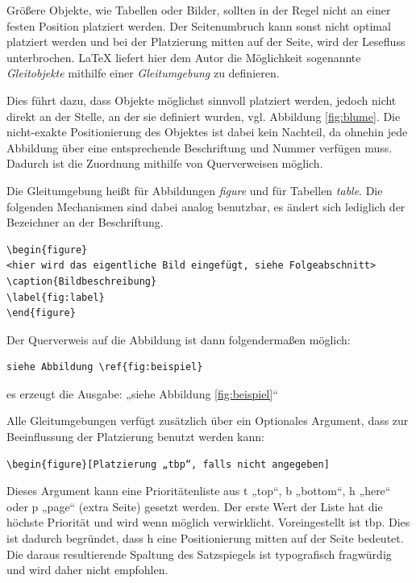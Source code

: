 Größere Objekte, wie Tabellen oder Bilder, sollten in der Regel nicht an einer festen Position platziert werden.
Der Seitenumbruch kann sonst nicht optimal platziert werden und bei der Platzierung mitten auf der Seite, wird der Lesefluss unterbrochen.
\LaTeX{} liefert hier dem Autor die Möglichkeit sogenannte \emph{Gleitobjekte} mithilfe einer \emph{Gleitumgebung} zu definieren.

Dies führt dazu, dass Objekte möglichst sinnvoll platziert werden, jedoch nicht direkt an der Stelle, an der sie definiert wurden, vgl. Abbildung \ref{fig:blume}.
Die nicht-exakte Positionierung des Objektes ist dabei kein Nachteil, da ohnehin jede Abbildung über eine entsprechende Beschriftung und Nummer verfügen muss.
Dadurch ist die Zuordnung mithilfe von Querverweisen möglich.

Die Gleitumgebung heißt für Abbildungen \emph{figure} und für Tabellen \emph{table}. Die folgenden Mechanismen sind dabei analog benutzbar, es ändert sich lediglich der Bezeichner an der Beschriftung.

\begin{verbatim}
\begin{figure}
<hier wird das eigentliche Bild eingefügt, siehe Folgeabschnitt>
\caption{Bildbeschreibung}
\label{fig:label}
\end{figure}
\end{verbatim}


Der Querverweis auf die Abbildung ist dann folgendermaßen möglich:
\begin{verbatim}
siehe Abbildung \ref{fig:beispiel}
\end{verbatim}
es erzeugt die Ausgabe: „siehe Abbildung \ref{fig:beispiel}“

Alle Gleitumgebungen verfügt zusätzlich über ein Optionales Argument, dass zur Beeinflussung der Platzierung benutzt werden kann:
\begin{verbatim}
\begin{figure}[Platzierung „tbp“, falls nicht angegeben]
\end{verbatim}

Dieses Argument kann eine Prioritätenliste aus t „top“, b „bottom“, h „here“ oder p „page“ (extra
Seite) gesetzt werden. Der erste Wert der Liste hat die höchste Priorität und wird wenn möglich verwirklicht.
Voreingestellt ist tbp. Dies ist dadurch begründet, dass h eine Positionierung mitten auf der Seite
bedeutet. Die daraus resultierende Spaltung des Satzspiegels ist typografisch fragwürdig und wird daher nicht empfohlen.


